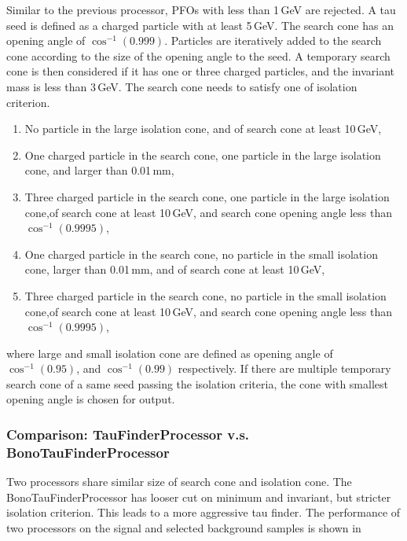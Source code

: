 Similar to the previous processor, PFOs with \pT less than 1\,GeV are rejected. A tau seed is defined as a charged particle with \pT at least 5\,GeV. The search cone has an opening angle of $\cos^{-1}(0.999)$. Particles are iteratively added to the search cone according to the size of the opening angle to the seed. A temporary search cone is then considered if it has one or three charged particles, and the invariant mass is less than 3\,GeV. The search cone needs to satisfy one of isolation criterion.
\begin{enumerate}
\item No particle in the large isolation cone, and \pT of search cone at least 10\,GeV,
\item One charged particle in the search cone, one particle in the large isolation cone, and \rZero larger than 0.01\,mm,
\item Three charged particle in the search cone, one particle in the large isolation cone,\pT of search cone at least 10\,GeV, and search cone opening angle less than $\cos^{-1}(0.9995)$,
\item One charged particle in the search cone, no particle in the small isolation cone, \rZero larger than 0.01\,mm, and \pT of search cone at least 10\,GeV,
\item Three charged particle in the search cone, no particle in the small isolation cone,\pT of search cone at least 10\,GeV, and search cone opening angle less than $\cos^{-1}(0.9995)$,
\end{enumerate}
where large and small isolation cone are defined as opening angle of $\cos^{-1}(0.95)$, and $\cos^{-1}(0.99)$ respectively.
If there are multiple temporary search cone of a same seed passing the isolation criteria, the cone with smallest opening angle is chosen for output.

\subsubsection{Comparison: TauFinderProcessor v.s. BonoTauFinderProcessor}

Two processors share similar size of search cone and isolation cone. The BonoTauFinderProcessor has looser cut on minimum \pT and invariant, but stricter isolation criterion. This leads to a more aggressive tau finder. The performance of two processors on the signal and selected background samples is shown in 


